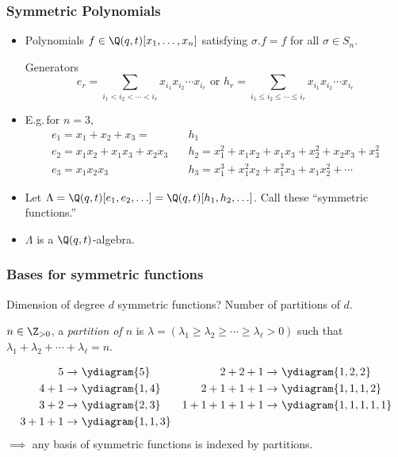 \documentclass[dvipsnames]{beamer}
\newcommand{\sym}{\Lambda}
\theoremstyle{definition}
\begin{document}
\begin{frame}
  \frametitle{Symmetric Polynomials}
  \begin{itemize}
  \item Polynomials \(f \in \Q(q,t)[x_1,\ldots,x_n]\) satisfying \(\sigma.f
    = f\) for all \(\sigma \in S_n\).\pause
    \begin{block}{Generators}
    \[
      e_r =
      \sum_{i_1 < i_2 < \cdots < i_r} x_{i_1} x_{i_2} \cdots x_{i_r}
      \text { or }
      h_r = 
      \sum_{i_1 \leq i_2 \leq \cdots \leq i_r} x_{i_1} x_{i_2} \cdots x_{i_r}
    \]\pause 
  \end{block}
    \item E.g.\,for \(n=3\),
    \begin{align*}
      e_1 = x_1 + x_2 + x_3 = & h_1  \\
      e_2 = x_1 x_2 + x_1 x_3 + x_2 x_3 \quad & h_2 = x_1^2 + x_1 x_2 + x_1
                                          x_3 + x_2^2 +  x_2 x_3 +x_3^2  \\
      e_3 = x_1 x_2 x_3 \quad & h_3 = x_1^3 + x_1^2 x_2 + x_1^2 x_3 + x_1
                          x_2^2 + \cdots
    \end{align*} \pause
    \item Let \(\sym =
      \Q(q,t)[e_1,e_2,\ldots] = \Q(q,t)[h_1,h_2,\ldots]\). Call these
      ``symmetric functions.''\pause
    \item \(\sym\) is a \(\Q(q,t)\)-algebra.
  \end{itemize}
\end{frame}
\begin{frame}
  \frametitle{Bases for symmetric functions}
  Dimension of degree \(d\) symmetric functions? \pause Number
    of partitions of \(d\).\pause
  \begin{definition}
    \(n \in \Z_{>0}\), a \emph{partition of \(n\)} is
    \(\lambda = (\lambda_1 \geq
    \lambda_2 \geq \cdots \geq \lambda_\ell > 0)\) such that
    \(\lambda_1+\lambda_2 + \cdots + \lambda_\ell = n \).
  \end{definition}\pause
  \begin{align*}
    5 \to &\ \ydiagram{5} & 
    2+2+1 \to&\ \ydiagram{1,2,2}\\
    4+1 \to &\ \ydiagram{1,4}&
    2+1+1+1 \to&\ \ydiagram{1,1,1,2} \\
    3+2 \to &\ \ydiagram{2,3}&
    1+1+1+1+1 \to&\ \ydiagram{1,1,1,1,1}\\
    3+1+1 \to &\ \ydiagram{1,1,3}
  \end{align*}\pause
  \(\implies\) any basis of symmetric functions is indexed by partitions.
\end{frame}
\end{document}
